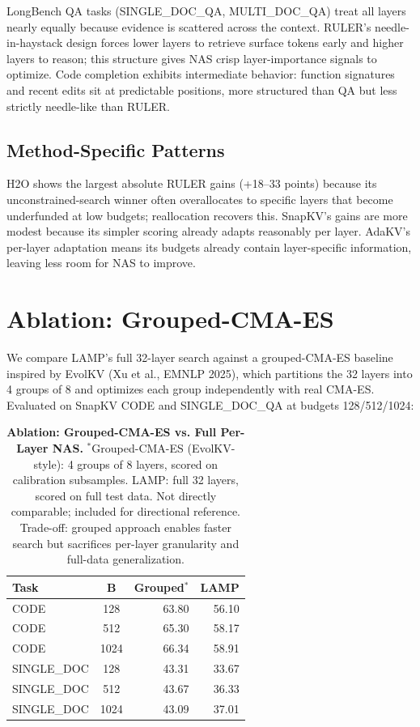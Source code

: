 \documentclass[11pt]{article}
\begin{document}
LongBench QA tasks (SINGLE\_DOC\_QA, MULTI\_DOC\_QA) treat all layers nearly equally because evidence is scattered across the context. RULER's needle-in-haystack design forces lower layers to retrieve surface tokens early and higher layers to reason; this structure gives NAS crisp layer-importance signals to optimize. Code completion exhibits intermediate behavior: function signatures and recent edits sit at predictable positions, more structured than QA but less strictly needle-like than RULER.

\subsection{Method-Specific Patterns}

H2O shows the largest absolute RULER gains (+18–33 points) because its unconstrained-search winner often overallocates to specific layers that become underfunded at low budgets; reallocation recovers this. SnapKV's gains are more modest because its simpler scoring already adapts reasonably per layer. AdaKV's per-layer adaptation means its budgets already contain layer-specific information, leaving less room for NAS to improve.

\section{Ablation: Grouped-CMA-ES}

We compare LAMP's full 32-layer search against a grouped-CMA-ES baseline inspired by EvolKV (Xu et al., EMNLP 2025), which partitions the 32 layers into 4 groups of 8 and optimizes each group independently with real CMA-ES. Evaluated on SnapKV CODE and SINGLE\_DOC\_QA at budgets 128/512/1024:

\begin{table}[t]
  \centering
  \small
  \setlength{\tabcolsep}{8pt}
  \begin{tabular}{@{} l c r r @{}}
    \toprule
    \textbf{Task} & \textbf{B} & \textbf{Grouped}$^*$ & \textbf{LAMP} \\
    \midrule
    \rowcolor{gray!10}
    CODE & 128 & 63.80 & 56.10 \\
    CODE & 512 & 65.30 & 58.17 \\
    \rowcolor{gray!10}
    CODE & 1024 & 66.34 & 58.91 \\
    SINGLE\_DOC & 128 & 43.31 & 33.67 \\
    \rowcolor{gray!10}
    SINGLE\_DOC & 512 & 43.67 & 36.33 \\
    SINGLE\_DOC & 1024 & 43.09 & 37.01 \\
    \bottomrule
  \end{tabular}
  \caption{\textbf{Ablation: Grouped-CMA-ES vs. Full Per-Layer NAS.} $^*$Grouped-CMA-ES (EvolKV-style): 4 groups of 8 layers, scored on calibration subsamples. LAMP: full 32 layers, scored on full test data. Not directly comparable; included for directional reference. Trade-off: grouped approach enables faster search but sacrifices per-layer granularity and full-data generalization.}
  \label{tab:ablation}
\end{table}
\end{document}
